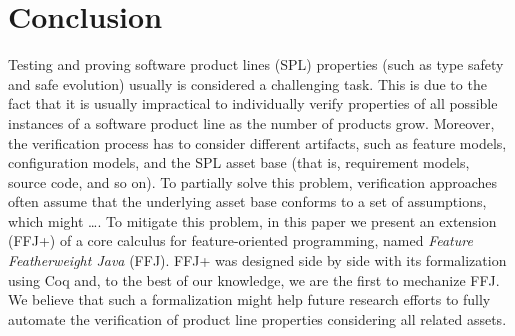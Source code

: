 \section{Conclusion}\label{seq:conclusion}

Testing and proving software product lines (SPL) %
properties (such as type safety and safe evolution) usually is
considered a challenging task. This is due to the fact that
it is usually impractical to individually verify properties of all possible 
instances of a software product line as the number of products grow. 
Moreover, the verification process has to consider different artifacts, 
such as feature models, configuration models, and the SPL asset 
base (that is, requirement models, source code, and so on). 
To partially solve this problem, verification approaches often  
assume that the underlying asset base conforms to a set 
of assumptions{\color{red}, which might \ldots}. 
To mitigate this problem, in this paper we 
present an extension (\ac{FFJ+}) of a core 
calculus for feature-oriented programming, named 
\emph{Feature Featherweight Java} (\ac{FFJ}). \ac{FFJ+} was designed 
side by side with its formalization using Coq and, to the best 
of our knowledge, we are the first to mechanize \ac{FFJ}.  
We believe that such a formalization might help future research efforts 
to fully automate the verification of product line properties 
considering all related assets.
